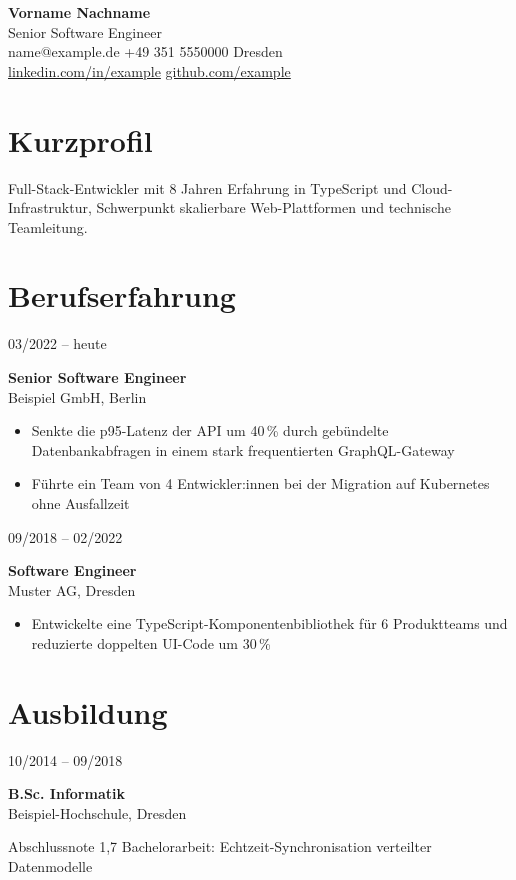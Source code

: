 \documentclass[11pt,a4paper]{article}
\newlength{\datecol}\setlength{\datecol}{3.8cm}
\newlength{\gutter}\setlength{\gutter}{0.4cm}
\newcommand{\cventry}[4]{%
  \noindent\begin{minipage}[t]{\datecol}\raggedright #1\end{minipage}%
  \hspace{\gutter}%
  \begin{minipage}[t]{\dimexpr\linewidth-\datecol-\gutter\relax}\raggedright
    \textbf{#2}\\ #3\par
    #4
  \end{minipage}\par\vspace{1.2ex}}
\begin{document}
{\LARGE\textbf{Vorname Nachname}}\\[0.5ex]
Senior Software Engineer\\[0.8ex]
name@example.de \quad +49 351 5550000 \quad Dresden\\
\href{https://linkedin.com/in/example}{linkedin.com/in/example} \quad
\href{https://github.com/example}{github.com/example}

\section{Kurzprofil}
Full-Stack-Entwickler mit 8 Jahren Erfahrung in TypeScript und Cloud-Infrastruktur, Schwerpunkt
skalierbare Web-Plattformen und technische Teamleitung.

\section{Berufserfahrung}

\cventry{03/2022 -- heute}{Senior Software Engineer}{Beispiel GmbH, Berlin}{%
\begin{itemize}
  \item Senkte die p95-Latenz der API um 40\,\% durch gebündelte Datenbankabfragen in einem stark frequentierten GraphQL-Gateway
  \item Führte ein Team von 4 Entwickler:innen bei der Migration auf Kubernetes ohne Ausfallzeit
\end{itemize}}

\cventry{09/2018 -- 02/2022}{Software Engineer}{Muster AG, Dresden}{%
\begin{itemize}
  \item Entwickelte eine TypeScript-Komponentenbibliothek für 6 Produktteams und reduzierte doppelten UI-Code um 30\,\%
\end{itemize}}

\section{Ausbildung}
\cventry{10/2014 -- 09/2018}{B.Sc. Informatik}{Beispiel-Hochschule, Dresden}{%
Abschlussnote 1,7 \textperiodcentered{} Bachelorarbeit: Echtzeit-Synchronisation verteilter Datenmodelle}
\end{document}
